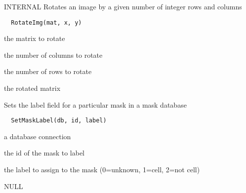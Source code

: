\documentclass[a4paper]{book}
\begin{document}
%
\begin{Description}\relax
INTERNAL Rotates an image by a given number of integer
rows and columns
\end{Description}
%
\begin{Usage}
\begin{verbatim}
  RotateImg(mat, x, y)
\end{verbatim}
\end{Usage}
%
\begin{Arguments}
\begin{ldescription}
\item[\code{mat}] the matrix to rotate

\item[\code{x}] the number of columns to rotate

\item[\code{y}] the number of rows to rotate
\end{ldescription}
\end{Arguments}
%
\begin{Value}
the rotated matrix
\end{Value}
%
\begin{Description}\relax
Sets the label field for a particular mask in a mask
database
\end{Description}
%
\begin{Usage}
\begin{verbatim}
  SetMaskLabel(db, id, label)
\end{verbatim}
\end{Usage}
%
\begin{Arguments}
\begin{ldescription}
\item[\code{db}] a database connection

\item[\code{id}] the id of the mask to label

\item[\code{label}] the label to assign to the mask (0=unknown,
1=cell, 2=not cell)
\end{ldescription}
\end{Arguments}
%
\begin{Value}
NULL
\end{Value}
\end{document}
